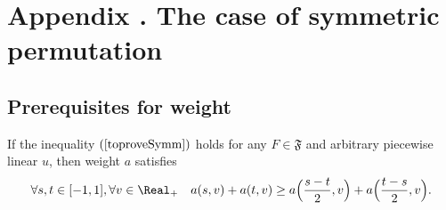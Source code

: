 \section{Appendix . The case of symmetric permutation}

\subsection{Prerequisites for weight}

\begin{lm}
If the inequality $(\ref{toproveSymm})$ holds for any $F \in \mathfrak{F}$
and arbitrary piecewise linear $u$, then
weight $a$ satisfies
\begin{equation}
\label{almostConvex}
\forall s, t \in [-1, 1], \forall v \in \Real_+ \quad
a( s, v ) + a( t, v ) \ge a\Big( \frac{ s - t }{2}, v \Big) + a\Big( \frac{ t - s }{2}, v \Big).
\end{equation}
\end{lm}

